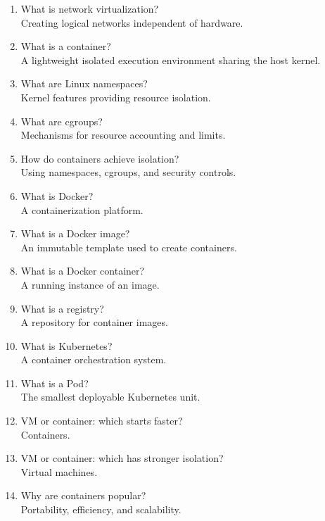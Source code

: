 \begin{enumerate}
\item What is network virtualization?\\
Creating logical networks independent of hardware.

\item What is a container?\\
A lightweight isolated execution environment sharing the host kernel.

\item What are Linux namespaces?\\
Kernel features providing resource isolation.

\item What are cgroups?\\
Mechanisms for resource accounting and limits.

\item How do containers achieve isolation?\\
Using namespaces, cgroups, and security controls.

\item What is Docker?\\
A containerization platform.

\item What is a Docker image?\\
An immutable template used to create containers.

\item What is a Docker container?\\
A running instance of an image.

\item What is a registry?\\
A repository for container images.

\item What is Kubernetes?\\
A container orchestration system.

\item What is a Pod?\\
The smallest deployable Kubernetes unit.

\item VM or container: which starts faster?\\
Containers.

\item VM or container: which has stronger isolation?\\
Virtual machines.

\item Why are containers popular?\\
Portability, efficiency, and scalability.
\end{enumerate}

